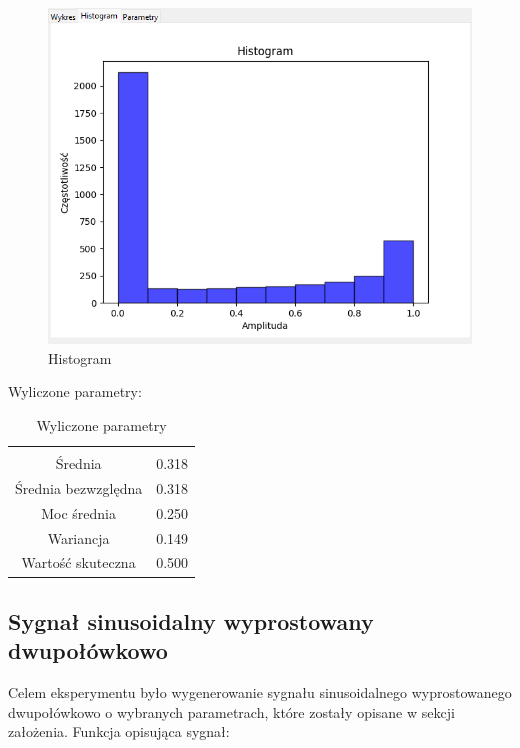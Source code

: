 \documentclass{article}
\begin{document}
\begin{figure}[h!]
    \centering
    \includegraphics[width=\textwidth]{img/sinus-jedno/hist.png}
    \caption{Histogram}
\end{figure}
\FloatBarrier
Wyliczone parametry:
\begin{table}[h!]
    \centering
    \vspace{0.2cm}
    \begin{tabular}{|c|c|}
        \hline\hline\\[-0.4cm]
        Średnia & 0.318  \\
        \hline
        Średnia bezwzględna & 0.318  \\
        \hline
        Moc średnia & 0.250  \\
        \hline
        Wariancja & 0.149 \\
        \hline
        Wartość skuteczna & 0.500 \\
        \hline
    \end{tabular}
    \caption{Wyliczone parametry}
    \label{sinusjednopolowkowy}
\end{table}

\subsection{Sygnał sinusoidalny wyprostowany dwupołówkowo} \label{sinusdwupolowkowy} 
Celem eksperymentu było wygenerowanie sygnału sinusoidalnego wyprostowanego dwupołówkowo o wybranych parametrach,
które zostały opisane w sekcji założenia. Funkcja opisująca sygnał:
\end{document}
